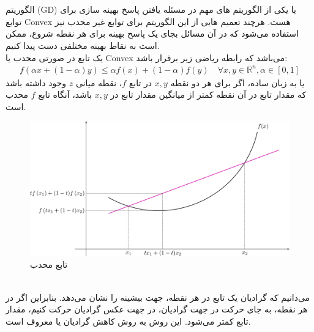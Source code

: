 \documentclass[fleqn]{article}
\theoremstyle{definition}
\begin{document}
\section{}
الگوریتم (GD) یا  یکی از الگوریتم های مهم در مسئله یافتن پاسخ بهینه سازی برای توابع Convex هست. هرچند تعمیم هایی از این الگوریتم برای توابع غیر محدب نیز استفاده می‌شود که در آن مسائل بجای یک پاسخ بهینه برای هر نقطه شروع، ممکن است به نقاط بهینه مختلفی دست پیدا کنیم.\\
یک تابع در صورتی محدب یا Convex می‌باشد که رابطه ریاضی زیر برقرار باشد:\\
\begin{gather*}
    f(\alpha x + (1-\alpha)y) \leq \alpha f(x) + (1-\alpha)f(y) \quad \forall x,y \in \mathbb{R}^n, \alpha \in [0,1]
\end{gather*}
یا به زبان ساده، اگر برای هر دو نقطه $x,y$ در تابع $f$، نقطه میانی $z$ وجود داشته باشد که مقدار تابع در آن نقطه کمتر از میانگین مقدار تابع در $x,y$ باشد، آنگاه تابع $f$ محدب است.\\
\begin{figure}[h!]
    \centering
    \includegraphics[width=0.6\linewidth]{./Pics/ConvexFunction.png}
    \caption{تابع محدب}
    \label{fig:convex}
\end{figure}
\\
می‌دانیم که گرادیان یک تابع در هر نقطه، جهت بیشینه را نشان می‌دهد. بنابراین اگر در هر نقطه، به جای حرکت در جهت گرادیان، در جهت عکس گرادیان حرکت کنیم، مقدار تابع کمتر می‌شود. این روش به روش کاهش گرادیان یا  معروف است.\\
\\
\end{document}
